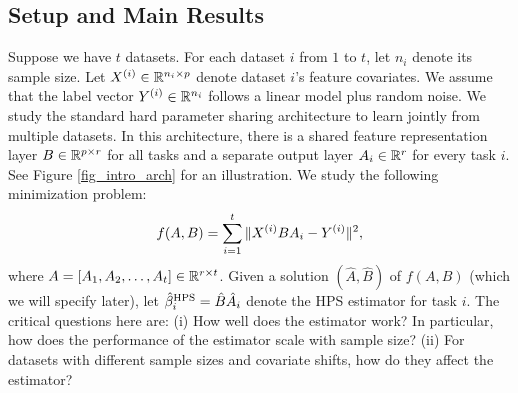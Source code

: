 \subsection{Setup and Main Results}

Suppose we have $t$ datasets.
For each dataset $i$ from $1$ to $t$, let $n_i$ denote its sample size.
Let $X^{(i)} \in \mathbb{R}^{n_i \times p}$ denote dataset $i$'s feature covariates.
We assume that the label vector $Y^{(i)} \in \mathbb{R}^{n_i}$ follows a linear model plus random noise.
We study the standard hard parameter sharing architecture to learn jointly from multiple datasets.
In this architecture, there is a shared feature representation layer $B\in\mathbb{R}^{p\times r}$ for all tasks and a separate output layer $A_i \in \mathbb{R}^r$ for every task $i$.
See Figure \ref{fig_intro_arch} for an illustration.
We study the following minimization problem:
\begin{align}\label{eq_mtl}
			f(A, B) = \sum_{i=1}^t \|X^{(i)} B A_i - Y^{(i)}\|^2,
\end{align}
where $A = [A_1, A_2, \dots, A_t] \in \mathbb{R}^{r \times t}$.
Given a solution $(\hat{A}, \hat{B})$ of $f(A, B)$ (which we will specify later), let $\hat{\beta}_i^{\textup{HPS}} = \hat{B} \hat{A}_i$ denote the HPS estimator for task $i$.
The critical questions here are:
(i) How well does the estimator work? In particular, how does the performance of the estimator scale with sample size?
(ii) For datasets with different sample sizes and covariate shifts, how do they affect the estimator?


